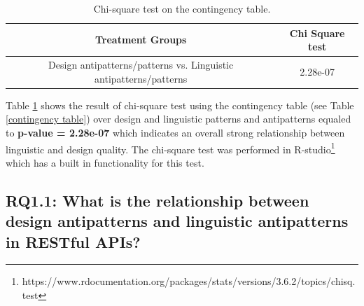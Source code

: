 \documentclass[a4paper,12pt]{article}
\begin{document}
\begin{table}[ht!]
\begin{center}
\begin{tabular}{|c|c|}
    \hline
   Treatment Groups  & Chi Square test \\ \hline
   Design antipatterns/patterns vs. Linguistic antipatterns/patterns  & 2.28e-07 \\ \hline
\end{tabular}
\caption{Chi-square test on the contingency table.}
\label{actual:Chi-square test}
\end{center}
\end{table}

Table \ref{actual:Chi-square test} shows the result of chi-square test using the contingency table (see Table \ref{contingency table}) over design and linguistic patterns and antipatterns equaled to \textbf{p-value = 2.28e-07} which indicates an overall strong relationship between linguistic and design quality. The chi-square test was performed in R-studio\footnote{https://www.rdocumentation.org/packages/stats/versions/3.6.2/topics/chisq.test} which has a built in functionality for this test. 

\clearpage

\subsection{\textbf{RQ1.1:} What is the relationship between design antipatterns and linguistic antipatterns in RESTful APIs?}
\end{document}
